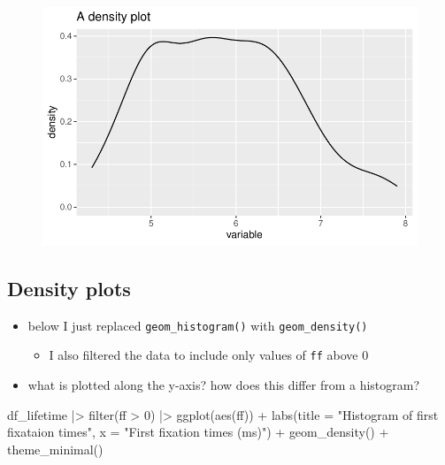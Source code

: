 \documentclass[
  letterpaper,
  DIV=11,
  numbers=noendperiod]{scrartcl}
\newenvironment{Shaded}{\begin{snugshade}}{\end{snugshade}}
\newcommand{\AttributeTok}[1]{\textcolor[rgb]{0.40,0.45,0.13}{#1}}
\newcommand{\DecValTok}[1]{\textcolor[rgb]{0.68,0.00,0.00}{#1}}
\newcommand{\FunctionTok}[1]{\textcolor[rgb]{0.28,0.35,0.67}{#1}}
\newcommand{\NormalTok}[1]{\textcolor[rgb]{0.00,0.23,0.31}{#1}}
\newcommand{\SpecialCharTok}[1]{\textcolor[rgb]{0.37,0.37,0.37}{#1}}
\newcommand{\StringTok}[1]{\textcolor[rgb]{0.13,0.47,0.30}{#1}}
\providecommand{\tightlist}{%
  \setlength{\itemsep}{0pt}\setlength{\parskip}{0pt}}\usepackage{longtable,booktabs,array}
\begin{document}
\begin{figure}[H]

{\centering \includegraphics{_data_viz_files/figure-pdf/unnamed-chunk-17-1.pdf}

}

\end{figure}

\hypertarget{density-plots}{%
\subsection{Density plots}\label{density-plots}}

\begin{itemize}
\tightlist
\item
  below I just replaced \texttt{geom\_histogram()} with
  \texttt{geom\_density()}

  \begin{itemize}
  \tightlist
  \item
    I also filtered the data to include only values of \texttt{ff} above
    0
  \end{itemize}
\item
  what is plotted along the y-axis? how does this differ from a
  histogram?
\end{itemize}

\begin{Shaded}
\begin{Highlighting}[numbers=left,,]
\NormalTok{df\_lifetime }\SpecialCharTok{|\textgreater{}} 
  \FunctionTok{filter}\NormalTok{(ff }\SpecialCharTok{\textgreater{}} \DecValTok{0}\NormalTok{) }\SpecialCharTok{|\textgreater{}} 
  \FunctionTok{ggplot}\NormalTok{(}\FunctionTok{aes}\NormalTok{(ff)) }\SpecialCharTok{+} 
  \FunctionTok{labs}\NormalTok{(}\AttributeTok{title =} \StringTok{"Histogram of first fixataion times"}\NormalTok{,}
       \AttributeTok{x =} \StringTok{"First fixation times (ms)"}\NormalTok{) }\SpecialCharTok{+}
  \FunctionTok{geom\_density}\NormalTok{() }\SpecialCharTok{+}
  \FunctionTok{theme\_minimal}\NormalTok{()}
\end{Highlighting}
\end{Shaded}
\end{document}
